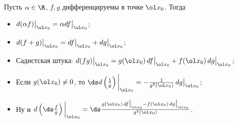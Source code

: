 
	 Пусть $\alpha \in\R$, $f,g$ дифференцируемы в точке $\ol x_0$. Тогда 
	 \begin{itemize}
	   \item $d(\alpha f)\big|_{\ol x_0} = \alpha df\big|_{\ol x_0}$;
	   \item $d(f+g)\big|_{\ol x_0} = df\big|_{\ol x_0} + dg\big|_{\ol x_0}$;
	   \item Садистская штука: $d(fg)\big|_{\ol x_0} = g (\ol x_0)\,df\big|_{\ol x_0} + f(\ol x_0)\,dg\big|_{\ol x_0}$;
	   \item Если $g(\ol x_0)\neq 0$, то $\ds d\left(\frac{1}{g}\right)\bigg|_{\ol x_0} = -\frac{1}{g^2(\ol x_0)}\,dg\big|_{\ol x_0}$;
	   \item Ну и $d\left(\ds\frac{f}{g}\right)\bigg|_{\ol x_0} = \ds\frac{g(\ol x_0)\,df\big|_{\ol x_0} - f(\ol x_0)\,dg\big|_{\ol x_0}}{g^2(\ol x_0)}$.
	 \end{itemize}
	 